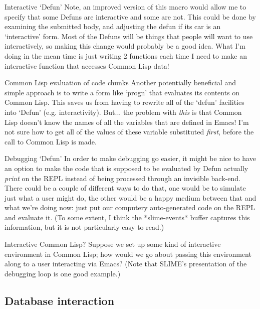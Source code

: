 \begin{notate}{Interactive `Defun'}
Note, an improved version of this macro would allow me to
specify that some Defuns are interactive and some are not.
This could be done by examining the submitted body, and
adjusting the defun if its car is an `interactive' form.
Most of the Defuns will be things that people will want to
use interactively, so making this change would probably be
a good idea.  What I'm doing in the mean time is just
writing 2 functions each time I need to make an
interactive function that accesses Common Lisp data!
\end{notate}

\begin{notate}{Common Lisp evaluation of code chunks}
Another potentially beneficial and simple approach is to
write a form like `progn' that evaluates its contents on
Common Lisp.  This saves us from having to rewrite all of
the `defun' facilities into `Defun' (e.g. interactivity).
But... the problem with \emph{this} is that Common Lisp
doesn't know the names of all the variables that are
defined in Emacs!  I'm not sure how to get all of the
values of these variable substituted \emph{first}, before
the call to Common Lisp is made.
\end{notate}

\begin{notate}{Debugging `Defun'}
In order to make debugging go easier, it might be nice to
have an option to make the code that is supposed to be
evaluated by Defun actually \emph{print} on the REPL
instead of being processed through an invisible back-end.
There could be a couple of different ways to do that, one
would be to simulate just what a user might do, the other
would be a happy medium between that and what we're doing
now: just put our computery auto-generated code on the
REPL and evaluate it.  (To some extent, I think the
*slime-events* buffer captures this information, but it is
not particularly easy to read.)
\end{notate}

\begin{notate}{Interactive Common Lisp?}
Suppose we set up some kind of interactive environment in
Common Lisp; how would we go about passing this
environment along to a user interacting via Emacs?  (Note
that SLIME's presentation of the debugging loop is one
good example.)
\end{notate}

\subsection{Database interaction} \label{interaction}

